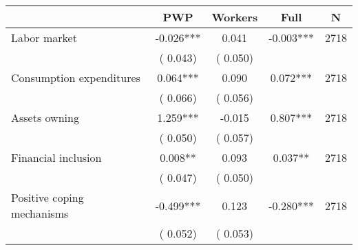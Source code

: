 
\begin{tabular}{l*{4}{c}}\hline&\multicolumn{1}{c}{PWP}&\multicolumn{1}{c}{Workers}&\multicolumn{1}{c}{Full}&\multicolumn{1}{c}{N} \\ \hline

 Labor market &             -0.026*** &         0.041 &          -0.003*** & 2718                       \\  
                 &        (       0.043)                   &        (       0.050)                        &                                                             &                                                      \\      

 Consumption expenditures &              0.064*** &         0.090 &           0.072*** & 2718                       \\  
                 &        (       0.066)                   &        (       0.056)                        &                                                             &                                                      \\      

 Assets owning &              1.259*** &        -0.015 &           0.807*** & 2718                       \\  
                 &        (       0.050)                   &        (       0.057)                        &                                                             &                                                      \\      

 Financial inclusion &              0.008** &         0.093 &           0.037** & 2718                       \\  
                 &        (       0.047)                   &        (       0.050)                        &                                                             &                                                      \\      

 Positive coping mechanisms &             -0.499*** &         0.123 &          -0.280*** & 2718                       \\  
                 &        (       0.052)                   &        (       0.053)                        &                                                             &                                                      \\      


\end{tabular}
